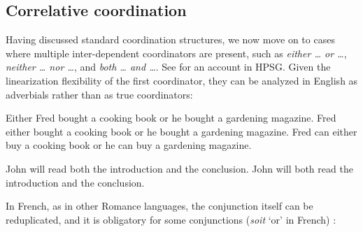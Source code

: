 \documentclass[output=paper
                ,modfonts
                ,nonflat
	        ,collection
	        ,collectionchapter
	        ,collectiontoclongg
 	        ,biblatex
                ,babelshorthands
                ,newtxmath
                ,draftmode
                ,colorlinks, citecolor=brown
]{./langsci/langscibook}
\begin{document}
{\subsection{Correlative coordination}\label{correlphr}


Having discussed standard coordination structures, we now move on to cases where
multiple inter-dependent coordinators are present, such as \emph{either \ldots{} or \ldots{}},
\emph{neither \ldots{} nor \ldots{}}, 
and \emph{both \ldots{} and \ldots{}}. See \citet{hof} for an account  in HPSG. Given the linearization flexibility of the first coordinator, they  can be analyzed in English as adverbials rather than as true coordinators:

\begin{exe}
 \ex
\begin{xlista}
\ex  Either Fred bought a cooking book or he bought a gardening magazine.
\ex  Fred either bought a cooking book or he bought a gardening magazine.
\ex  Fred can either buy a cooking book or he can buy a gardening magazine.
\end{xlista}
\end{exe}


\begin{exe}
 \ex
\begin{xlista}
\ex John will read both the introduction and the conclusion.
\ex John will both read the introduction and the conclusion.
\end{xlista}
\end{exe}



\noindent
In French, as in other Romance languages, the conjunction itself can be reduplicated, and it is
obligatory for some conjunctions (\emph{soit} `or' in French) \parencites{Mouret:05}[--206]{Bilbiie:17}:

\begin{exe}
 \ex
\begin{xlista}
\end{xlista}
\end{exe}

}
\end{document}
